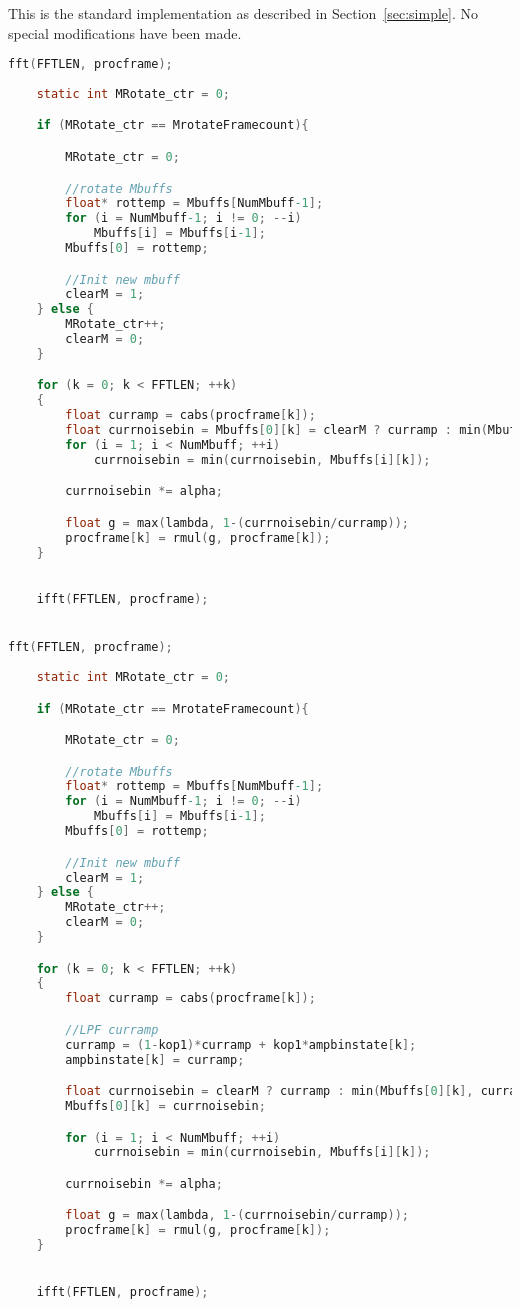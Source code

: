 \documentclass[11pt]{article} %
\begin{document}
This is the standard implementation as described in Section~\ref{sec:simple}. No special modifications have been made. 
  \begin{center}
    \begin{lstlisting}[language = C]
fft(FFTLEN, procframe);
									
    static int MRotate_ctr = 0;

	if (MRotate_ctr == MrotateFramecount){

		MRotate_ctr = 0;

		//rotate Mbuffs
		float* rottemp = Mbuffs[NumMbuff-1];
		for (i = NumMbuff-1; i != 0; --i)
			Mbuffs[i] = Mbuffs[i-1];
		Mbuffs[0] = rottemp;

		//Init new mbuff
		clearM = 1;
	} else {
		MRotate_ctr++;
		clearM = 0;
	}

	for (k = 0; k < FFTLEN; ++k)
	{
		float curramp = cabs(procframe[k]); 
		float currnoisebin = Mbuffs[0][k] = clearM ? curramp : min(Mbuffs[0][k], curramp);
		for (i = 1; i < NumMbuff; ++i)
			currnoisebin = min(currnoisebin, Mbuffs[i][k]);

		currnoisebin *= alpha;

		float g = max(lambda, 1-(currnoisebin/curramp));
		procframe[k] = rmul(g, procframe[k]);
	}

	
	ifft(FFTLEN, procframe);


fft(FFTLEN, procframe);
									
    static int MRotate_ctr = 0;

	if (MRotate_ctr == MrotateFramecount){

		MRotate_ctr = 0;

		//rotate Mbuffs
		float* rottemp = Mbuffs[NumMbuff-1];
		for (i = NumMbuff-1; i != 0; --i)
			Mbuffs[i] = Mbuffs[i-1];
		Mbuffs[0] = rottemp;

		//Init new mbuff
		clearM = 1;
	} else {
		MRotate_ctr++;
		clearM = 0;
	}

	for (k = 0; k < FFTLEN; ++k)
	{
		float curramp = cabs(procframe[k]); 

		//LPF curramp
		curramp = (1-kop1)*curramp + kop1*ampbinstate[k];
		ampbinstate[k] = curramp;

		float currnoisebin = clearM ? curramp : min(Mbuffs[0][k], curramp);
		Mbuffs[0][k] = currnoisebin;

		for (i = 1; i < NumMbuff; ++i)
			currnoisebin = min(currnoisebin, Mbuffs[i][k]);

		currnoisebin *= alpha;

		float g = max(lambda, 1-(currnoisebin/curramp));
		procframe[k] = rmul(g, procframe[k]);
	}

	
	ifft(FFTLEN, procframe);
    \end{lstlisting}
  \end{center}
\end{document}
